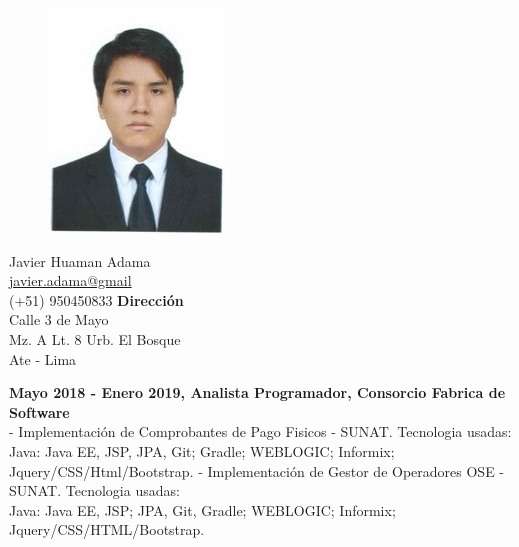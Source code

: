 \documentclass[a4paper,12pt,final]{memoir}
\newcommand{\Sep}{\vspace{1.5em}}
\newcommand{\SmallSep}{\vspace{0.5em}}
\newcommand{\CVItem}[1]
	{\textbf{\color{RoyalBlue} #1}}
\begin{document}
\begin{figure}
	\hfill
	\includegraphics[width=0.6\columnwidth]{profile}
	\vspace{-7cm}
\end{figure}

\begin{flushright}\small
	Javier Huaman Adama \\
	\url{javier.adama@gmail}  \\
	(+51) 950450833
	\Sep
	\textbf{Dirección} \\
	Calle 3 de Mayo \\ %
	Mz. A Lt. 8 Urb. El Bosque \\ %
	Ate - Lima \\ %
\end{flushright}\normalsize
\framebreak

\CVItem{Mayo 2018 - Enero 2019, Analista Programador, Consorcio Fabrica de Software}\\
- Implementación de Comprobantes de Pago Fisicos - SUNAT. Tecnologia usadas:\\
Java: Java EE, JSP, JPA, Git; Gradle; WEBLOGIC; Informix;\\ Jquery/CSS/Html/Bootstrap.
- Implementación de Gestor de Operadores OSE - SUNAT. Tecnologia usadas:\\
Java: Java EE, JSP; JPA, Git, Gradle; WEBLOGIC; Informix;\\ Jquery/CSS/HTML/Bootstrap.
\SmallSep
\end{document}

